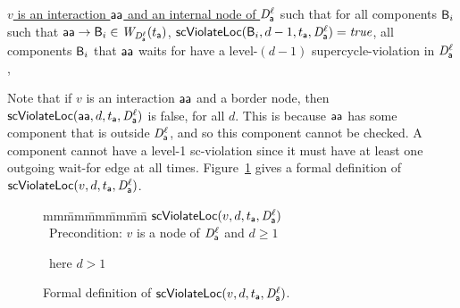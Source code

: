 \item \ul{$v$ is an interaction $\mathsf{aa}$ and an internal node of $\mathit{D}_{\mathsf{a}}^{\ell}$} such that
   for all components $\mathsf{B}_i$ such that $\mathsf{aa} \rightarrow \mathsf{B}_i \in \mathit{W}_{\mathit{D}_{\mathsf{a}}^{\ell}}({t_{\mathsf{a}}})$, $\mathsf{scViolateLoc}(\mathsf{B}_i,d-1,t_{\mathsf{a}},\mathit{D}_{\mathsf{a}}^{\ell}) = \mathit{true}$,
         \ie all components $\mathsf{B}_i$ that $\mathsf{aa}$ waits for have a level-$(d-1)$ supercycle-violation in $\mathit{D}_{\mathsf{a}}^{\ell}$,

\ee
\ed
%
Note that if $v$ is an interaction $\mathsf{aa}$ and a border node, then
$\mathsf{scViolateLoc}(\mathsf{aa},d,t_{\mathsf{a}},\mathit{D}_{\mathsf{a}}^{\ell})$ is false, for all $d$.  This is because $\mathsf{aa}$ has some
component that is outside $\mathit{D}_{\mathsf{a}}^{\ell}$, and so this component cannot be checked.  A component
cannot have a level-1 sc-violation since it must
have at least one outgoing wait-for edge at all times.
%
Figure~\ref{fig:scViolateLoc} gives a formal definition of $\mathsf{scViolateLoc}(v,d,t_{\mathsf{a}},\mathit{D}_{\mathsf{a}}^{\ell})$.



 
\begin{figure}[ht]
\setcounter{lctr}{0}
\begin{tabbing}
mm\= mm\= mm\= mm\= mm\=\kill
$\mathsf{scViolateLoc}(v,d,t_{\mathsf{a}},\mathit{D}_{\mathsf{a}}^{\ell})$\\
\cmnt\ Precondition: $v$ is a node of $\mathit{D}_{\mathsf{a}}^{\ell}$ and $d \ge 1$\\

       \lit{\ELSE\ \RETURNE{\fff}}
       \lit{\FI}
\lio{\FI}

\cmnt\ here $d > 1$\\

        \lit{\RETURNE{\ttt}}

      \lit{\RETURNE{\ttt}}

\lio{\ELSE\ \RETURNE{\fff}}
\lio{\FI}
\end{tabbing}
\caption{Formal definition of $\mathsf{scViolateLoc}(v,d,t_{\mathsf{a}},\mathit{D}_{\mathsf{a}}^{\ell})$.}
\label{fig:scViolateLoc}
\end{figure}



